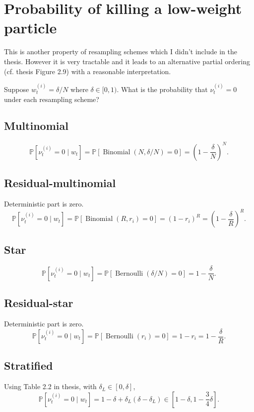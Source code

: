 \documentclass[fleqn]{article}
\newcommand{\Prob}{\mathbb{P}}
\newcommand{\1}[1]{\mathbb{I}_{#1}}
\newcommand{\Bern}{\operatorname{Bernoulli}}
\newcommand{\Bin}{\operatorname{Binomial}}
\begin{document}
\section{Probability of killing a low-weight particle}
This is another property of resampling schemes which I didn't include in the thesis. However it is very tractable and it leads to an alternative partial ordering (cf. thesis Figure 2.9) with a reasonable interpretation.

Suppose $w_t^{(i)} = \delta/N$ where $\delta \in [0,1)$.
What is the probability that $\nu_t^{(i)} =0$ under each resampling scheme?

\subsection*{Multinomial}
\begin{equation*}
\Prob[ \nu_t^{(i)} =0 \mid w_t ]
= \Prob[ \Bin(N, \delta/N) =0 ]
= \left( 1- \frac{\delta}{N} \right)^N .
\end{equation*}

\subsection*{Residual-multinomial}
Deterministic part is zero.
\begin{equation*}
\Prob[ \nu_t^{(i)} =0 \mid w_t ]
= \Prob[ \Bin(R, r_i) =0 ]
= \left( 1- r_i \right)^R 
= \left( 1- \frac{\delta}{R} \right)^R .
\end{equation*}

\subsection*{Star}
\begin{equation*}
\Prob[ \nu_t^{(i)} =0 \mid w_t ]
= \Prob[ \Bern(\delta/N) =0 ]
= 1- \frac{\delta}{N} .
\end{equation*}

\subsection*{Residual-star}
Deterministic part is zero.
\begin{equation*}
\Prob[ \nu_t^{(i)} =0 \mid w_t ]
= \Prob[ \Bern(r_i) =0 ]
= 1- r_i
= 1- \frac{\delta}{R} .
\end{equation*}

\subsection*{Stratified}
Using Table 2.2 in thesis, with $\delta_L \in [0,\delta]$,
\begin{equation*}
\Prob[ \nu_t^{(i)} =0 \mid w_t ]
= 1 - \delta + \delta_L (\delta - \delta_L)
\in \left[ 1-\delta, 1- \frac{3}{4}\delta \right] .
\end{equation*}
\end{document}
